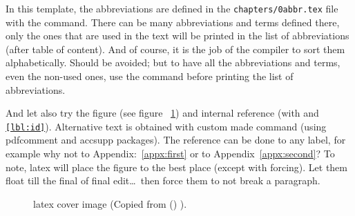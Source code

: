 In this template, the abbreviations are defined in the \texttt{chapters/0abbr.tex} file with the \texttt{} command. There can be many abbreviations and terms defined there, only the ones that are used in the text will be printed in the list of abbreviations (after table of content). And of course, it is the job of the compiler to sort them alphabetically. Should be avoided; but to have all the abbreviations and terms, even the non-used ones, use the \texttt{\glsaddall} command before printing the list of abbreviations.


And let also try the figure (see figure ~\ref{fig:latex-cover}) and internal reference (with \texttt{\label{lbl:id}} and \texttt{\ref{lbl:id}}). Alternative text is obtained with custom made \texttt{} command (using pdfcomment and accsupp packages). The reference can be done to any label, for example why not to Appendix:~\ref{appx:first} or to Appendix~\ref{appx:second}? To note, \gls{latex} will place the figure to the best place (except with forcing). Let them float till the final of final edit\ldots ~then force them to not break a paragraph.%

\begin{figure}[ht]
  \centering
  \caption{\gls{latex} cover image (Copied from \citeauthor{wikibooks:latex} () \cite{wikibooks:latex}).}
  \label{fig:latex-cover}
\end{figure}

